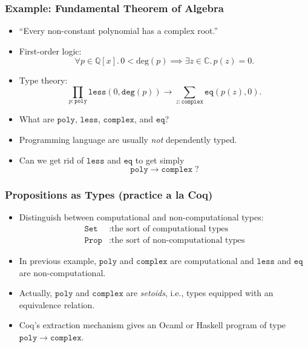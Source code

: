\documentclass[t]{beamer}
\newcommand{\QQ}{\mathbb{Q}}
\newcommand{\CC}{\mathbb{C}}
\begin{document}
\begin{frame}
  \frametitle{Example: Fundamental Theorem of Algebra}

  \begin{itemize}
  \item ``Every non-constant polynomial has a complex root.''
  \item First-order logic:
    \begin{equation*}
      \forall p \in \QQ[x] .\,
      0 < \mathrm{deg}(p) \implies \exists z \in \CC .\, p(z) = 0.
    \end{equation*}
  \item Type theory:
    \begin{equation*}
      \textstyle
      \prod_{p : \mathtt{poly}} \mathtt{less}(0,
      \mathtt{deg}(p)) \to
      \sum_{z : \mathtt{complex}} \mathtt{eq}(p(z),0).
    \end{equation*}
  \item What are $\mathtt{poly}$, $\mathtt{less}$, $\mathtt{complex}$, and $\mathtt{eq}$?
  \item Programming language are usually \emph{not} dependently typed.
  \item Can we get rid of $\mathtt{less}$ and $\mathtt{eq}$ to get simply
    \begin{equation*}
      \mathtt{poly} \to \mathtt{complex} \; ?
    \end{equation*}
  \end{itemize}

\end{frame}

\begin{frame}
  \frametitle{Propositions as Types (practice a la Coq)}

  \begin{itemize}
  \item Distinguish between computational and non-computational types:
    \begin{align*}
      \mathtt{Set} &: \text{the sort of computational types} \\
      \mathtt{Prop} &: \text{the sort of non-computational types}
    \end{align*}
  \item In previous example, $\mathtt{poly}$ and $\mathtt{complex}$
    are computational and $\mathtt{less}$ and $\mathtt{eq}$ are
    non-computational.
  \item Actually, $\mathtt{poly}$ and $\mathtt{complex}$ are
    \emph{setoids}, i.e., types equipped with an equivalence relation.
  \item Coq's extraction mechanism gives an Ocaml or Haskell program of type
    $\mathtt{poly} \to \mathtt{complex}$.
  \end{itemize}
\end{frame}
\end{document}
